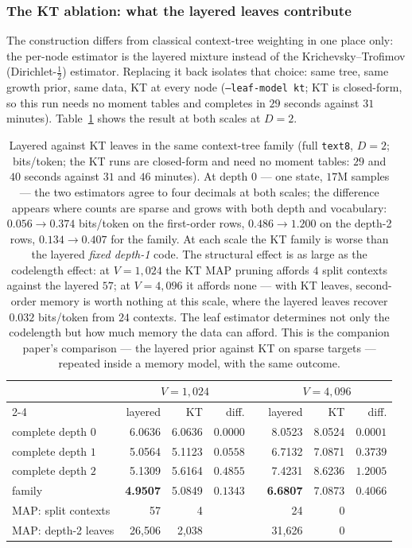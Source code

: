 \documentclass[11pt]{article}
\begin{document}
\subsubsection*{The KT ablation: what the layered leaves contribute}
The construction differs from classical context-tree weighting in one
place only: the per-node estimator is the layered mixture instead of
the Krichevsky--Trofimov (Dirichlet-$\tfrac12$) estimator.  Replacing
it back isolates that choice: same tree, same growth prior, same data,
KT at every node (\texttt{--leaf-model kt}; KT is closed-form, so this
run needs no moment tables and completes in $29$ seconds against $31$
minutes).  Table~\ref{tab:kt-ablation} shows the result at
both scales at $D=2$.

\begin{table}[ht]
\centering
\begin{tabular}{lrrrcrrr}
\toprule
 & \multicolumn{3}{c}{$V=1{,}024$} & & \multicolumn{3}{c}{$V=4{,}096$} \\
\cmidrule{2-4}\cmidrule{6-8}
 & layered & KT & diff. & & layered & KT & diff. \\
\midrule
complete depth $0$ & 6.0636 & 6.0636 & $0.0000$ & & 8.0523 & 8.0524 & $0.0001$ \\
complete depth $1$ & 5.0564 & 5.1123 & $0.0558$ & & 6.7132 & 7.0871 & $0.3739$ \\
complete depth $2$ & 5.1309 & 5.6164 & $0.4855$ & & 7.4231 & 8.6236 & $1.2005$ \\
family             & \textbf{4.9507} & 5.0849 & $0.1343$ & & \textbf{6.6807} & 7.0873 & $0.4066$ \\
\midrule
MAP: split contexts & 57 & 4 & & & 24 & 0 & \\
MAP: depth-2 leaves & 26{,}506 & 2{,}038 & & & 31{,}626 & 0 & \\
\bottomrule
\end{tabular}
\caption{Layered against KT leaves in the same context-tree family
  (full \texttt{text8}, $D=2$; bits/token; the KT runs are closed-form
  and need no moment tables: $29$ and $40$ seconds against $31$ and
  $46$ minutes).  At depth $0$ --- one state, $17$M samples --- the
  two estimators agree to four decimals at both scales; the difference
  appears where counts are sparse and grows with both depth and
  vocabulary: $0.056 \to 0.374$ bits/token on the first-order rows,
  $0.486 \to 1.200$ on the depth-2 rows, $0.134 \to 0.407$ for the
  family.  At each scale the KT family is worse than the layered
  \emph{fixed depth-1} code.  The structural effect is as large as the
  codelength effect: at $V=1{,}024$ the KT MAP pruning affords $4$
  split contexts against the layered $57$; at $V=4{,}096$ it affords
  none --- with KT leaves, second-order memory is worth nothing at
  this scale, where the layered leaves recover $0.032$ bits/token from
  $24$ contexts.  The leaf estimator determines not only the
  codelength but how much memory the data can afford.  This is the
  companion paper's comparison --- the layered prior against KT on
  sparse targets --- repeated inside a memory model, with the same
  outcome.}
\label{tab:kt-ablation}
\end{table}
\end{document}
